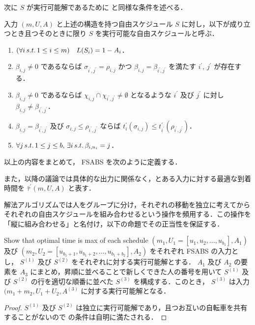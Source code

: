 次に $S$ が実行可能解であるために \textcite{czyzowicz} と同様な条件を述べる．
\begin{definition}\label{definition:fsabs-feasible-schedule}
  入力 $(m, U, A)$ と上述の構造を持つ自由スケジュール $S$ に対し，以下が成り立つとき且つそのときに限り $S$ を実行可能な自由スケジュールと呼ぶ．
  \begin{enumerate}
  \item $(\forall i\,s.t.\, 1 \leq i \leq m)\quad L(S_i) = 1 - A_i$．
  \item $\beta_{i,j} \neq 0$ であるならば $\sigma_{i^\prime, j^\prime} = \rho_{i,j} \text{ かつ } \beta_{i,j} = \beta_{i^\prime, j^\prime}$ を満たす $i^\prime$, $j^\prime$ が存在する．
  \item $\beta_{i,j} \neq 0$ であるならば $\chi_{i,j} \cap \chi_{i^\prime,j^\prime} \neq \emptyset$ となるような $i^\prime$ 及び $j^\prime$ に対し $\beta_{i,j} \neq \beta_{i^\prime,j ^\prime}$．
  \item $\beta_{i,j} = \beta_{i^\prime, j^\prime}$ 及び $\sigma_{i,j} \leq \rho_{i^\prime, j^{\prime}}$ ならば $t^{\prime}_i(\sigma_{i, j}) \leq t^{\prime}_{i^\prime}(\rho_{i^\prime, j^\prime})$．
  \item $\forall j \,s.t.\, 1 \leq j \leq b,\, \exists i \,s.t.\, \beta_{i,n_i} = j$．
  \end{enumerate}
\end{definition}

以上の内容をまとめて， FSABS を次のように定義する．
\begin{problem}
\end{problem}
また，以降の議論では具体的な出力に関係なく，とある入力に対する最適な到着時間を $\bar\tau^\prime(m, U, A)$ と表す．

解法アルゴリズムでは人をグループに分け，それぞれの移動を独立に考えてからそれぞれの自由スケジュールを組み合わせるという操作を頻用する．この操作を「縦に組み合わせる」と名付け，以下の命題でその正当性を保証する．
\begin{proposition}\label{proposition:vertical-composition}
  {\color{red} Show that optimal time is max of each schedule}
  $(m_1, U_1 = [u_1, u_2, \ldots, u_{b_1}], A_1)$ 及び $(m_2, U_2 = [u_{b_1+1}, u_{b_1+2}, \ldots, u_{b_1+b_2}], A_2)$ をそれぞれ FSABS の入力とし， $S^{(1)}$ 及び $S^{(2)}$ をそれぞれに対する実行可能解とする． $A_1$ 及び $A_2$ の要素を $A_3$ にまとめ，昇順に並べることで新しくできた人の番号を用いて $S^{(1)}$ 及び $S^{(2)}$ の行を適切な順番に並べた $S^{(3)}$ を構成する．このとき， $S^{(3)}$ は入力 $(m_1 + m_2, U_1 + U_2, A^{(3)}$ に対する実行可能解となる．
\end{proposition}
\begin{proof}
  $S^{(1)}$ 及び $S^{(2)}$ は独立に実行可能解であり，且つお互いの自転車を共有することがないので  の条件は自明に満たされる．
\end{proof}

